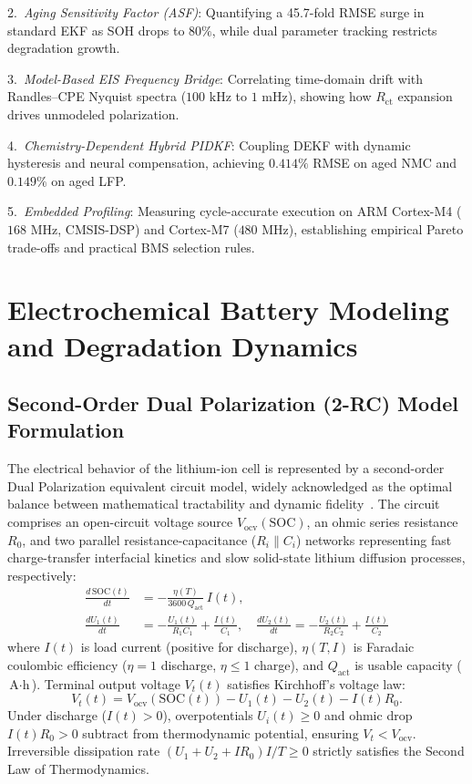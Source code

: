 \documentclass[balance,nocopyright,upint,varvw,hyphenate,barcolor=NavyBlue,nolists]{asmejour}
\begin{document}
2.~\emph{Aging Sensitivity Factor (ASF)}: Quantifying a 45.7-fold RMSE surge in standard EKF as SOH drops to $80\%$, while dual parameter tracking restricts degradation growth.

3.~\emph{Model-Based EIS Frequency Bridge}: Correlating time-domain drift with Randles--CPE Nyquist spectra ($100\text{ kHz}$ to $1\text{ mHz}$), showing how $R_{\text{ct}}$ expansion drives unmodeled polarization.

4.~\emph{Chemistry-Dependent Hybrid PIDKF}: Coupling DEKF with dynamic hysteresis and neural compensation, achieving $0.414\%$ RMSE on aged NMC and $0.149\%$ on aged LFP.

5.~\emph{Embedded Profiling}: Measuring cycle-accurate execution on ARM Cortex-M4 ($168\text{ MHz}$, CMSIS-DSP) and Cortex-M7 ($480\text{ MHz}$), establishing empirical Pareto trade-offs and practical BMS selection rules.

\section{Electrochemical Battery Modeling and Degradation Dynamics}

\subsection{Second-Order Dual Polarization (2-RC) Model Formulation}
The electrical behavior of the lithium-ion cell is represented by a second-order Dual Polarization equivalent circuit model, widely acknowledged as the optimal balance between mathematical tractability and dynamic fidelity~\cite{Hu2012ecm,Xiong2014}. The circuit comprises an open-circuit voltage source $V_{\text{ocv}}(\text{SOC})$, an ohmic series resistance $R_0$, and two parallel resistance-capacitance ($R_i \parallel C_i$) networks representing fast charge-transfer interfacial kinetics and slow solid-state lithium diffusion processes, respectively:
\begin{align}
\frac{d\,\text{SOC}(t)}{dt} &= -\frac{\eta(T)}{3600\,Q_{\text{act}}}\,I(t), \label{eqn:soc_diff}\\
\frac{d U_1(t)}{dt} &= -\frac{U_1(t)}{R_1 C_1} + \frac{I(t)}{C_1}, \quad \frac{d U_2(t)}{dt} = -\frac{U_2(t)}{R_2 C_2} + \frac{I(t)}{C_2} \label{eqn:u12_diff}
\end{align}
where $I(t)$ is load current (positive for discharge), $\eta(T, I)$ is Faradaic coulombic efficiency ($\eta = 1$ discharge, $\eta \le 1$ charge), and $Q_{\text{act}}$ is usable capacity ($\text{A}\cdot\text{h}$). Terminal output voltage $V_t(t)$ satisfies Kirchhoff's voltage law:
\begin{equation}\label{eqn:vt_diff}
V_t(t) = V_{\text{ocv}}(\text{SOC}(t)) - U_1(t) - U_2(t) - I(t) R_0.
\end{equation}
Under discharge ($I(t) > 0$), overpotentials $U_i(t) \ge 0$ and ohmic drop $I(t) R_0 > 0$ subtract from thermodynamic potential, ensuring $V_t < V_{\text{ocv}}$. Irreversible dissipation rate $(U_1 + U_2 + I R_0) I / T \ge 0$ strictly satisfies the Second Law of Thermodynamics.
\end{document}
